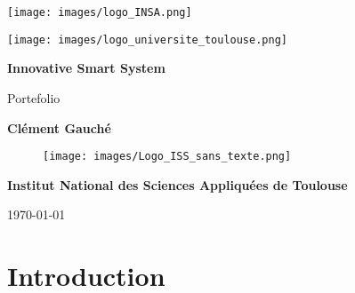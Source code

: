 \begin{titlepage}
    \centering

    \noindent %
    \begin{minipage}{0.5\textwidth}
        \texttt{[image: images/logo\_INSA.png]} %
    \end{minipage}%
    \hfill %
    \begin{minipage}{0.5\textwidth}
        \flushright %
        \texttt{[image: images/logo\_universite\_toulouse.png]} %
    \end{minipage}


    \vspace*{2cm} %
    {\Huge\bfseries Innovative Smart System \par}
    \vspace{1cm}
    {\huge Portefolio\par}
    \vspace{2cm}
    {\Large \textbf{Clément Gauché} \par}
    \vspace{2cm}
    
    \begin{figure}[H]
    \centering
    \texttt{[image: images/Logo\_ISS\_sans\_texte.png]}
    \end{figure}
    
    \vfill
    {\Large \textbf{Institut National des Sciences Appliquées de Toulouse} \par}
    \vspace{1cm}
    {\large \today \par}
\end{titlepage}

\begin{abstract}
    \lipsum[1] %
\end{abstract}

\tableofcontents

\chapter{Introduction}

